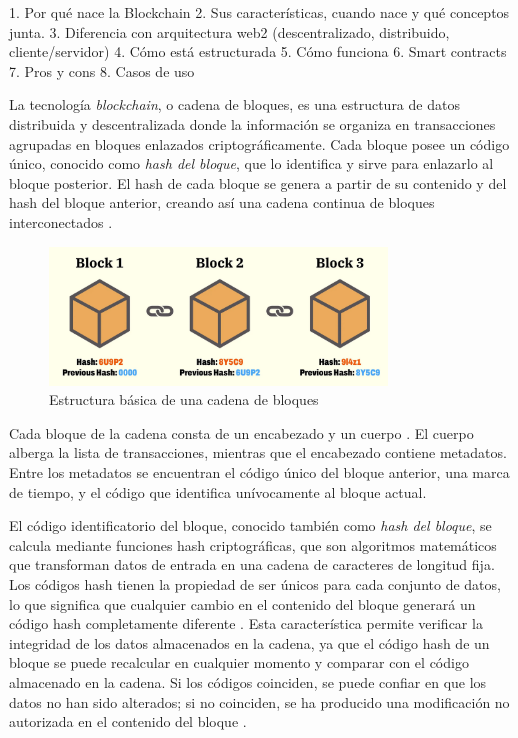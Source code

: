 1. Por qué nace la Blockchain
2. Sus características, cuando nace y qué conceptos junta.
3. Diferencia con arquitectura web2 (descentralizado, distribuido, cliente/servidor)
4. Cómo está estructurada
5. Cómo funciona
6. Smart contracts
7. Pros y cons
8. Casos de uso

La tecnología \textit{blockchain}, o cadena de bloques, es una estructura de datos distribuida y descentralizada donde la información se organiza en transacciones agrupadas en bloques enlazados criptográficamente. Cada bloque posee un código único, conocido como \textit{hash del bloque}, que lo identifica y sirve para enlazarlo al bloque posterior. El hash de cada bloque se genera a partir de su contenido y del hash del bloque anterior, creando así una cadena continua de bloques interconectados \cite{tripathi2023comprehensive}.

\begin{figure}[h]
    \centering
    \includegraphics[width=0.8\textwidth]{Figures/blockchain-basic.jpg}
    \caption{Estructura básica de una cadena de bloques}
    \label{fig:blockchain-basic}
\end{figure}

Cada bloque de la cadena consta de un encabezado y un cuerpo \cite{tripathi2023comprehensive}. El cuerpo alberga la lista de transacciones, mientras que el encabezado contiene metadatos. Entre los metadatos se encuentran el código único del bloque anterior, una marca de tiempo, y el código que identifica unívocamente al bloque actual.

El código identificatorio del bloque, conocido también como \textit{hash del bloque}, se calcula mediante funciones hash criptográficas, que son algoritmos matemáticos que transforman datos de entrada en una cadena de caracteres de longitud fija. Los códigos hash tienen la propiedad de ser únicos para cada conjunto de datos, lo que significa que cualquier cambio en el contenido del bloque generará un código hash completamente diferente \cite{pending}. Esta característica permite verificar la integridad de los datos almacenados en la cadena, ya que el código hash de un bloque se puede recalcular en cualquier momento y comparar con el código almacenado en la cadena. Si los códigos coinciden, se puede confiar en que los datos no han sido alterados; si no coinciden, se ha producido una modificación no autorizada en el contenido del bloque \cite{pending}.

